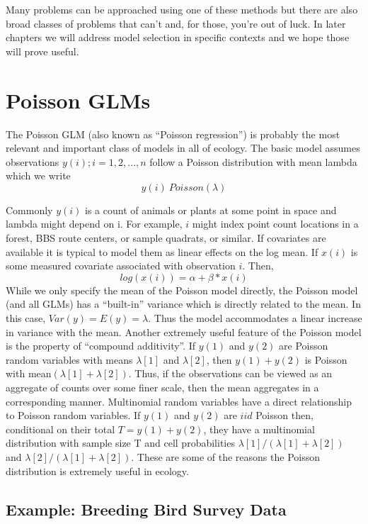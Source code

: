 \citep{johnson:1999}
	
Many problems can be approached using one of these methods but there
are also broad classes of problems that can't and, for those, you're
out of luck. In later chapters we will address model selection in
specific contexts and we hope those will prove useful.


\section{Poisson GLMs}
The Poisson GLM (also known as ``Poisson regression'') is probably the most relevant and important class of models in all of ecology. The basic model assumes observations $y(i); i=1,2,...,n$ follow a Poisson distribution with mean lambda which we write
\[
 	y(i) ~Poisson(\lambda)\]

Commonly $y(i)$ is a count of animals or plants at some point in space and lambda might depend on i. For example, $i$ might index point count locations in a forest, BBS route centers, or sample quadrats, or similar.  If covariates are available it is typical to model them as linear effects on the log mean. If $x(i)$ is some measured covariate associated with observation $i$. Then,
\[
 	log(x(i)) = \alpha  + \beta*x(i)
\]
While we only specify the mean of the Poisson model directly, the Poisson model (and all GLMs) has a ``built-in'' variance which is directly related to the mean. In this case, $Var(y) = E(y) = \lambda$. Thus the model accommodates a linear increase in variance with the mean.  Another extremely useful feature of the Poisson model is the property of ``compound additivity''. If $y(1)$ and $y(2)$ are Poisson random variables with means $\lambda[1]$ and $\lambda[2]$, then $y(1)+y(2)$ is Poisson with mean$(\lambda[1]+\lambda[2])$. Thus, if the observations can be viewed as an aggregate of counts over some finer scale, then the mean aggregates in a corresponding manner.  Multinomial random variables have a direct relationship to Poisson random variables. If $y(1)$ and $y(2)$ are $iid$ Poisson then, conditional on their total $T = y(1) + y(2)$, they have a multinomial distribution with sample size T and cell probabilities $\lambda[1]/(\lambda[1]+\lambda[2])$ and $\lambda[2]/(\lambda[1]+\lambda[2])$.  These are some of the reasons the Poisson distribution is extremely useful in ecology.



\subsection{Example: Breeding Bird Survey Data}


